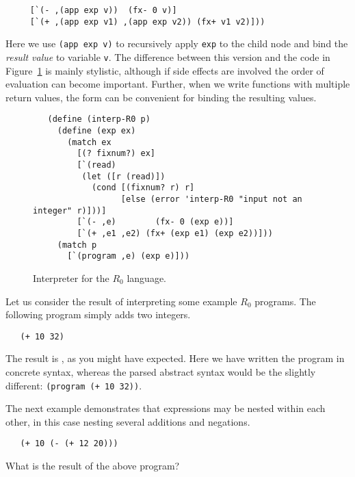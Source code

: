 \documentclass[11pt]{book}
\newcommand{\rn}[1]{{\color{comment-red}{(RRN: #1)}}}
\newcommand{\rn}[1]{}
\begin{document}
\begin{minipage}{0.5\textwidth}
\begin{lstlisting}
     [`(- ,(app exp v))  (fx- 0 v)]
     [`(+ ,(app exp v1) ,(app exp v2)) (fx+ v1 v2)]))
\end{lstlisting}
\end{minipage}

Here we use \lstinline{(app exp v)} to recursively apply \texttt{exp} to the
child node and bind the \emph{result value} to variable \texttt{v}.  The
difference between this version and the code in Figure~\ref{fig:interp-R0} is
mainly stylistic, although if side effects are involved the order of evaluation
can become important.  Further, when we write functions with multiple return
values, the  form can be convenient for binding the resulting values.

\begin{figure}[tbp]
\begin{lstlisting}
   (define (interp-R0 p)
     (define (exp ex)
       (match ex
         [(? fixnum?) ex]
         [`(read)
          (let ([r (read)])
            (cond [(fixnum? r) r]
                  [else (error 'interp-R0 "input not an integer" r)]))]
         [`(- ,e)        (fx- 0 (exp e))]
         [`(+ ,e1 ,e2) (fx+ (exp e1) (exp e2))]))
     (match p
       [`(program ,e) (exp e)]))
\end{lstlisting}
\caption{Interpreter for the $R_0$ language.
  \rn{Having two functions here for prog/exp wouldn't take much more space.
    I'll change that once I get further.. but I also need to know what the story
   is for running this code?}}
\label{fig:interp-R0}
\end{figure}

Let us consider the result of interpreting some example $R_0$
programs. The following program simply adds two integers.
\begin{lstlisting}
   (+ 10 32)
\end{lstlisting}
The result is , as you might have expected.  Here we have written the
program in concrete syntax, whereas the parsed abstract syntax would be the
slightly different: \lstinline{(program (+ 10 32))}.

The next example demonstrates that expressions may be nested within
each other, in this case nesting several additions and negations.
\begin{lstlisting}
   (+ 10 (- (+ 12 20)))
\end{lstlisting}
What is the result of the above program?
\end{document}

